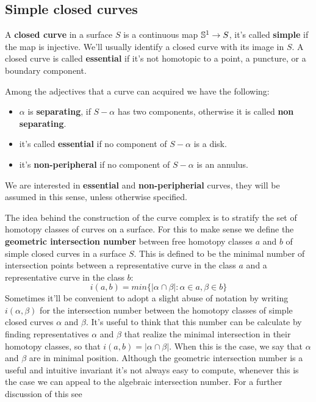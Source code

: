 \subsection{Simple closed curves}

\begin{defini}
A \textbf{closed curve} in a surface $S$ is a continuous map $\S^{1}\to S$, it's called \textbf{simple} if the map is injective. We'll usually identify a closed curve with its image in $S$. A closed curve is called \textbf{essential} if it's not homotopic to a point, a puncture, or a boundary component.
\end{defini}
Among the adjectives that a curve can acquired we have the following:
\begin{itemize}
    \item $\alpha$ is \textbf{separating}, if $S-\alpha$ has two components, otherwise it is called \textbf{non separating}.
    \item it's called \textbf{essential} if no component of $S- \alpha$ is a disk.
    \item it's \textbf{non-peripheral} if no component of $S - \alpha$ is an annulus. 
\end{itemize}

We are interested in \textbf{essential} and \textbf{non-peripherial} curves, they will be assumed in this sense, unless otherwise specified.

The idea behind the construction of the curve complex is to stratify the set of homotopy classes of curves on a surface. For this to make sense we define the \textbf{geometric intersection number} between free homotopy classes $a$ and $b$ of simple closed curves in a surface $S$. This is defined to be the minimal number of intersection points between a representative curve in the class $a$ and a representative curve in the class $b$:
$$i(a,b) = min \{ |\alpha \cap \beta| : \alpha \in a, \beta \in b \}$$
Sometimes it'll be convenient to adopt a slight abuse of notation by writing $i(\alpha, \beta)$ for the intersection number between the homotopy classes of simple closed curves $\alpha$ and $\beta$. It's useful to think that this number can be calculate by finding representatives $\alpha$ and $\beta$ that realize the minimal intersection in their homotopy classes, so that $i(a, b) = |\alpha \cap \beta|$. When this is the case, we say that $\alpha$ and $\beta$ are in minimal position. Although the geometric intersection number is a useful and intuitive invariant it's not always easy to compute, whenever this is the case we can appeal to the algebraic intersection number. For a further discussion of this see \cite[Farb]{Farb}

